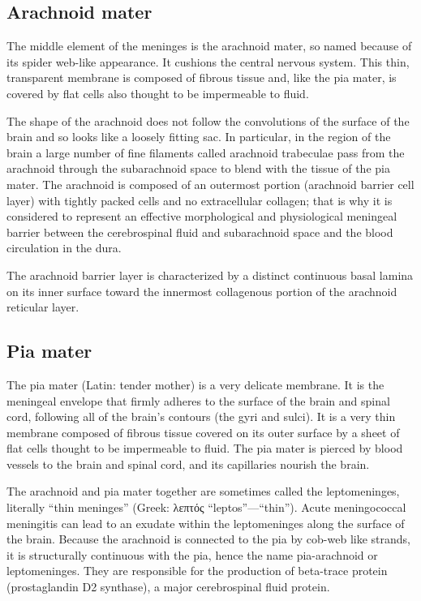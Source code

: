 \hypertarget{arachnoid-mater}{%
\subsection{Arachnoid mater}\label{arachnoid-mater}}

The middle element of the meninges is the arachnoid mater, so named because of its spider web-like appearance. It cushions the central nervous system. This thin, transparent membrane is composed of fibrous tissue and, like the pia mater, is covered by flat cells also thought to be impermeable to fluid.

The shape of the arachnoid does not follow the convolutions of the surface of the brain and so looks like a loosely fitting sac. In particular, in the region of the brain a large number of fine filaments called arachnoid trabeculae pass from the arachnoid through the subarachnoid space to blend with the tissue of the pia mater. The arachnoid is composed of an outermost portion (arachnoid barrier cell layer) with tightly packed cells and no extracellular collagen; that is why it is considered to represent an effective morphological and physiological meningeal barrier between the cerebrospinal fluid and subarachnoid space and the blood circulation in the dura.

The arachnoid barrier layer is characterized by a distinct continuous basal lamina on its inner surface toward the innermost collagenous portion of the arachnoid reticular layer.

\hypertarget{pia-mater}{%
\subsection{Pia mater}\label{pia-mater}}

The pia mater (Latin: tender mother) is a very delicate membrane. It is the meningeal envelope that firmly adheres to the surface of the brain and spinal cord, following all of the brain's contours (the gyri and sulci). It is a very thin membrane composed of fibrous tissue covered on its outer surface by a sheet of flat cells thought to be impermeable to fluid. The pia mater is pierced by blood vessels to the brain and spinal cord, and its capillaries nourish the brain.

The arachnoid and pia mater together are sometimes called the leptomeninges, literally ``thin meninges'' (Greek: λεπτός ``leptos''---``thin''). Acute meningococcal meningitis can lead to an exudate within the leptomeninges along the surface of the brain. Because the arachnoid is connected to the pia by cob-web like strands, it is structurally continuous with the pia, hence the name pia-arachnoid or leptomeninges. They are responsible for the production of beta-trace protein (prostaglandin D2 synthase), a major cerebrospinal fluid protein.

